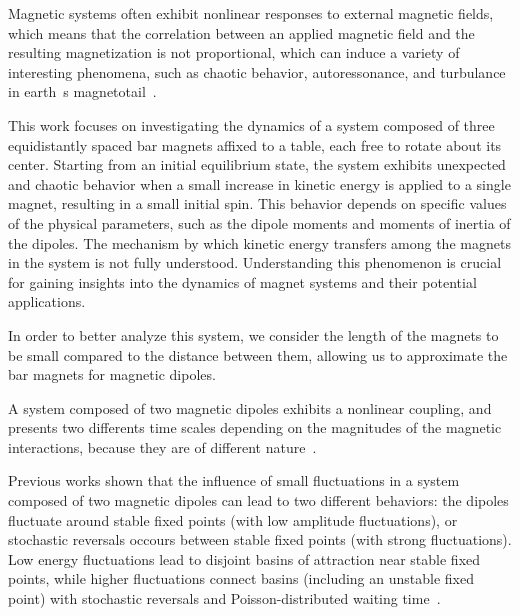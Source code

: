 Magnetic systems often exhibit nonlinear responses to external magnetic fields, which means that the correlation between an applied magnetic field and the resulting magnetization is not proportional, which can induce a variety of interesting phenomena, such as chaotic behavior, autoressonance, and turbulance in earth\textquotesingle~s magnetotail~\cite{nonlinearResponse,Bratman1983,Loeb1986,VerandaM,Brunton2017,Chang1999}. 


This work focuses on investigating the dynamics of a system composed of three equidistantly spaced bar magnets affixed to a table, each free to rotate about its center. Starting from an initial equilibrium state, the system exhibits unexpected and chaotic behavior when a small increase in kinetic energy is applied to a single magnet, resulting in a small initial spin. This behavior depends on specific values of the physical parameters, such as the dipole moments and moments of inertia of the dipoles. The mechanism by which kinetic energy transfers among the magnets in the system is not fully understood. Understanding this phenomenon is crucial for gaining insights into the dynamics of magnet systems and their potential applications.

In order to better analyze this system, we consider the length of the magnets to be small compared to the distance between them, allowing us to approximate the bar magnets for magnetic dipoles.

A system composed of two magnetic dipoles exhibits a nonlinear coupling, and presents two differents time scales depending on the magnitudes of the magnetic interactions, because they are of different nature~\cite{LAROZE20081440}. 

Previous works shown that the influence of small fluctuations in a system composed of two magnetic dipoles can lead to two different behaviors: the dipoles fluctuate around stable fixed points (with low amplitude fluctuations), or stochastic reversals occours between stable fixed points (with strong fluctuations). Low energy fluctuations lead to disjoint basins of attraction near stable fixed points, while higher fluctuations connect basins (including an unstable fixed point) with stochastic reversals and Poisson-distributed waiting time~\cite{StochasticReversalDynamics}. 

